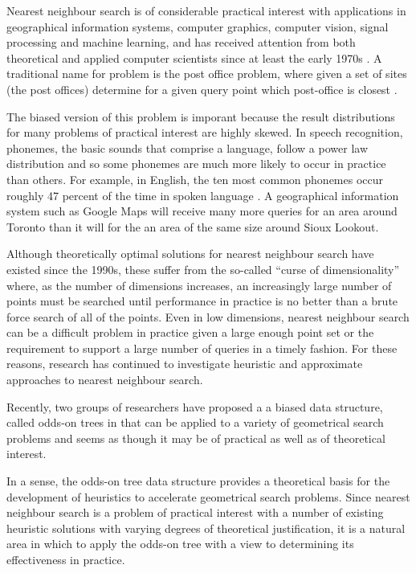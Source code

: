 \documentclass[mcs]{scsthesis}
\begin{document}
Nearest neighbour search is of considerable practical interest with
applications in geographical information systems, computer graphics,
computer vision, signal processing and machine learning, and has received
attention from both theoretical and applied computer scientists since at least
the early 1970s \cite{knuth} \cite{kdtree}. A traditional name for problem is
the post office problem, where given a set of sites (the post offices) determine
for a given query point which post-office is closest \cite{knuth}.

The biased version of this problem is imporant because the result distributions
for many problems of practical interest are highly skewed.  In speech
recognition, phonemes, the basic sounds that comprise a language, follow a power
law distribution \cite{yule} and so some phonemes are much more likely to occur
in practice than others. For example, in English, the ten most common phonemes
occur roughly 47 percent of the time in spoken language \cite{english-frequency}.
A geographical information system such as Google Maps will receive many more
queries for an area around Toronto than it will for the an area of the same
size around Sioux Lookout.

Although theoretically optimal solutions for nearest neighbour search have
existed since the 1990s, these suffer from the so-called ``curse of
dimensionality'' where, as the number of dimensions increases, an increasingly
large number of points must be searched until performance in practice is no
better than a brute force search of all of the points. Even in low dimensions,
nearest neighbour search can be a difficult problem in practice given a large
enough point set or the requirement to support a large number of queries in a
timely fashion. For these reasons, research has continued to investigate
heuristic and approximate approaches to nearest neighbour search. 
 
Recently, two groups of researchers \cite{oddson,chan} have proposed a
a biased data structure, called odds-on trees in \cite{oddson} that can be
applied to a variety of geometrical search problems and seems as though it
may be of practical as well as of theoretical interest.

In a sense, the odds-on tree data structure provides a theoretical basis for
the development of heuristics to accelerate geometrical search problems. Since
nearest neighbour search is a problem of practical interest with a number of
existing heuristic solutions with varying degrees of theoretical justification,
it is a natural area in which to apply the odds-on tree with a view to
determining its effectiveness in practice.
\end{document}
